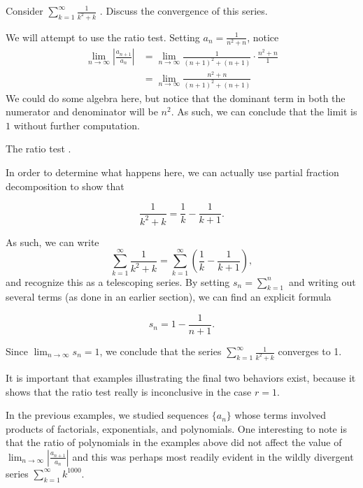 \documentclass{ximera}
\begin{document}
\begin{example}
  Consider $\sum_{k=1}^\infty \frac{1}{k^2+k}$ .  Discuss the convergence of this series.
  \begin{explanation}
    We will attempt to use the ratio test. Setting $a_n =
    \frac{1}{n^2+n}$, notice 
\begin{align*}
     \lim_{n \to \infty} \left|\frac{a_{n+1}}{a_n}\right| &= \lim_{n \to \infty} \frac{1}{(n+1)^2+(n+1)} \cdot  \frac{n^2+n}{1} \\
     &= \lim_{n \to \infty} \frac{n^2+n}{(n+1)^2+(n+1)}
\end{align*}
We could do some algebra here, but notice that the dominant term in both the numerator and denominator will be $n^2$.  As such, we can conclude that the limit is $1$ without further computation.

The ratio test 
    .		
  
In order to determine what happens here, we can actually use partial fraction decomposition to show that 

\[
\frac{1}{k^2+k} = \frac{1}{k}-\frac{1}{k+1}.
\] 

As such, we can write \[\sum_{k=1}^{\infty} \frac{1}{k^2+k} = \sum_{k=1}^{\infty} \left(\frac{1}{k}-\frac{1}{k+1}\right),\] and recognize this as a telescoping series.  By setting $s_n = \sum_{k=1}^n$ and writing out several terms (as done in an earlier section), we can find an explicit formula

\[
s_n = 1 - \frac{1}{n+1}.
\]

Since $\lim_{n \to \infty} s_n = 1$, we conclude that the series $\sum_{k=1}^{\infty} \frac{1}{k^2+k}$ converges to 1.
\end{explanation}
\end{example}

\begin{remark}
It is important that examples illustrating the final two behaviors
exist, because it shows that the ratio test really is inconclusive in
the case $r=1$.
\end{remark}

In the previous examples, we studied sequences $\{a_n\}$ whose terms involved products of factorials, exponentials, and polynomials.  One interesting to note is that the ratio of polynomials in the examples above did not affect the value of $\lim_{n \to \infty} \left|\frac{a_{n+1}}{a_n}\right|$ and this was perhaps most readily evident in the wildly divergent series $\sum_{k=1}^{\infty} k^{1000}$.
\end{document}
